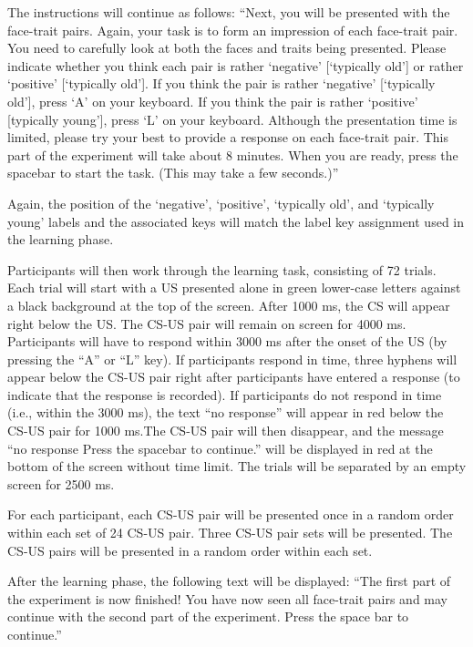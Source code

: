\documentclass[
  doc,floatsintext]{apa6}
\begin{document}
The instructions will continue as follows:
``Next, you will be presented with the face-trait pairs.
Again, your task is to form an impression of each face-trait pair. You need to carefully look at both the faces and traits being presented.
Please indicate whether you think each pair is rather `negative' {[}`typically old'{]} or rather `positive' {[}`typically old'{]}.
If you think the pair is rather `negative' {[}`typically old'{]}, press `A' on your keyboard.
If you think the pair is rather `positive' {[}typically young'{]}, press `L' on your keyboard.
Although the presentation time is limited,
please try your best to provide a response on each face-trait pair.
This part of the experiment will take about 8 minutes.
When you are ready, press the spacebar to start the task.
(This may take a few seconds.)''

Again, the position of the `negative', `positive', `typically old', and `typically young' labels and the associated keys will match the label key assignment used in the learning phase.

Participants will then work through the learning task, consisting of 72 trials.
Each trial will start with a US presented alone in green lower-case letters against a black background at the top of the screen. After 1000 ms, the CS will appear right below the US.
The CS-US pair will remain on screen for 4000 ms.
Participants will have to respond within 3000 ms after the onset of the US (by pressing the ``A'' or ``L'' key).
If participants respond in time, three hyphens will appear below the CS-US pair right after participants have entered a response (to indicate that the response is recorded).
If participants do not respond in time (i.e., within the 3000 ms), the text ``no response'' will appear in red below the CS-US pair for 1000 ms.The CS-US pair will then disappear, and the message ``no response Press the spacebar to continue.'' will be displayed in red at the bottom of the screen without time limit.
The trials will be separated by an empty screen for 2500 ms.

For each participant, each CS-US pair will be presented once in a random order within each set of 24 CS-US pair. Three CS-US pair sets will be presented. The CS-US pairs will be presented in a random order within each set.

After the learning phase, the following text will be displayed:
``The first part of the experiment is now finished!
You have now seen all face-trait pairs and may continue with the second part of the experiment.
Press the space bar to continue.''
\end{document}
